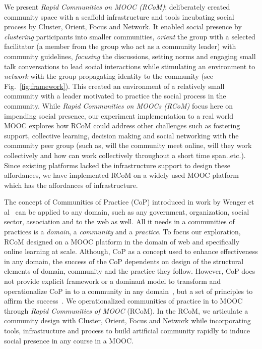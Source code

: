 \documentclass[format=acmsmall, review=false, screen=true]{acmart}
\begin{document}
We present \textit{Rapid Communities on MOOC (RCoM)}: deliberately created community space with a scaffold infrastructure and tools incubating social process by Cluster, Orient, Focus and Network. It enabled social presence by \textit{clustering} participants into smaller communities, \textit{orient} the group with a selected facilitator (a member from the group who act as a community leader) with community guidelines, \textit{focusing} the discussions, setting norms and engaging small talk conversations to lead social interactions while stimulating an environment to \textit{network} with the group propagating identity to the community (see Fig.~\ref{fig:framework}). This created an environment of a relatively small community with a leader motivated to practice the social process in the community. While \textit{Rapid Communities on MOOCs (RCoM)} focus here on impending social presence, our experiment implementation to a real world MOOC explores how RCoM could address other challenges such as fostering support, collective learning, decision making and social networking with the community peer group (such as, will the community meet online, will they work collectively and how can work collectively throughout a short time span..etc.). Since existing platforms lacked the infrastructure support to design these affordances, we have implemented RCoM on a widely used MOOC platform which has the affordances of infrastructure.

The concept of Communities of Practice (CoP) introduced in work by Wenger et al~\cite{wenger1999communities} can be applied to any domain, such as any government, organization, social sector, association and to the web as well. All it needs in a communities of practices is a \textit{domain}, a \textit{community} and a \textit{practice}. To focus our exploration, RCoM designed on a MOOC platform in the domain of web and specifically online learning at scale. Although, CoP as a concept used to enhance effectiveness in any domain, the success of the CoP dependents on design of the structural elements of domain, community and the practice they follow. However, CoP does not provide explicit framework or a dominant model to transform and operationalize CoP in to a community in any domain~\cite{li2009evolution}, but a set of principles to affirm the success~\cite{wenger2002seven}. We operationalized communities of practice in to MOOC through \textit{Rapid Communities of MOOC} (RCoM). In the RCoM, we articulate a community design with Cluster, Orient, Focus and Network while incorporating tools, infrastructure and process to build artificial community rapidly to induce social presence in any course in a MOOC. 
\end{document}

